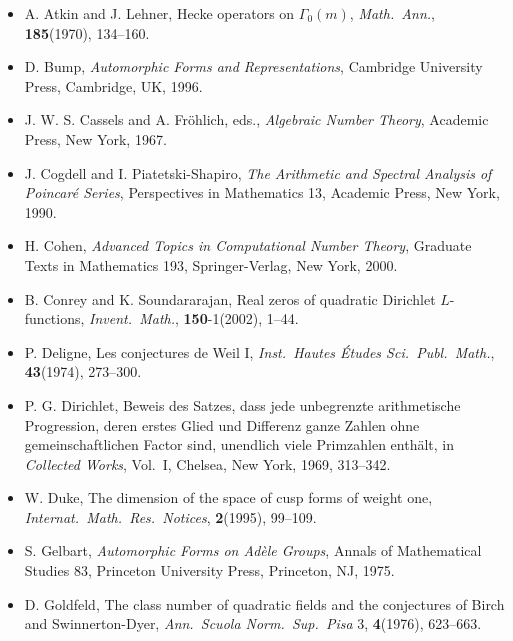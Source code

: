 \begin{itemize}[leftmargin=4.6em,itemsep=0.22em,topsep=0.3em,label={}]
\item[{[AL]}] A. Atkin and J. Lehner, Hecke operators on $\Gamma_{0}(m)$, \emph{Math.\ Ann.}, \textbf{185}(1970), 134--160.
\item[{[Bu]}] D. Bump, \emph{Automorphic Forms and Representations}, Cambridge University Press, Cambridge, UK, 1996.
\item[{[CF]}] J. W. S. Cassels and A. Fröhlich, eds., \emph{Algebraic Number Theory}, Academic Press, New York, 1967.
\item[{[CP]}] J. Cogdell and I. Piatetski-Shapiro, \emph{The Arithmetic and Spectral Analysis of Poincaré Series}, Perspectives in Mathematics 13, Academic Press, New York, 1990.
\item[{[Co]}] H. Cohen, \emph{Advanced Topics in Computational Number Theory}, Graduate Texts in Mathematics 193, Springer-Verlag, New York, 2000.
\item[{[CS]}] B. Conrey and K. Soundararajan, Real zeros of quadratic Dirichlet $L$-functions, \emph{Invent.\ Math.}, \textbf{150}-1(2002), 1--44.
\item[{[De]}] P. Deligne, Les conjectures de Weil I, \emph{Inst.\ Hautes Études Sci.\ Publ.\ Math.}, \textbf{43}(1974), 273--300.
\item[{[Di]}] P. G. Dirichlet, Beweis des Satzes, dass jede unbegrenzte arithmetische Progression, deren erstes Glied und Differenz ganze Zahlen ohne gemeinschaftlichen Factor sind, unendlich viele Primzahlen enthält, in \emph{Collected Works}, Vol.~I, Chelsea, New York, 1969, 313--342.
\item[{[Du]}] W. Duke, The dimension of the space of cusp forms of weight one, \emph{Internat.\ Math.\ Res.\ Notices}, \textbf{2}(1995), 99--109.
\item[{[Ge]}] S. Gelbart, \emph{Automorphic Forms on Adèle Groups}, Annals of Mathematical Studies 83, Princeton University Press, Princeton, NJ, 1975.
\item[{[Go]}] D. Goldfeld, The class number of quadratic fields and the conjectures of Birch and Swinnerton-Dyer, \emph{Ann.\ Scuola Norm.\ Sup.\ Pisa} 3, \textbf{4}(1976), 623--663.


\end{itemize}
